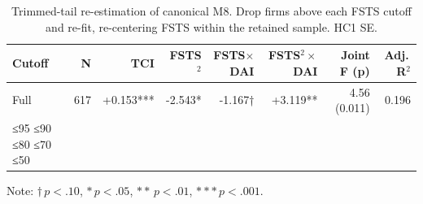 \begin{table}[ht]
\centering
\caption{Trimmed-tail re-estimation of canonical M8. Drop firms above each FSTS cutoff and re-fit, re-centering FSTS within the retained sample. HC1 SE.}
\label{tab:trimmed_tail}
\begin{tabular}{lrrrrrrr}
\toprule
Cutoff & N & TCI & FSTS$^2$ & FSTS$\times$DAI & FSTS$^2\times$DAI & Joint F (p) & Adj.\,R$^2$ \\
\midrule
Full & 617 & +0.153*** & -2.543* & -1.167† & +3.119** & 4.56 (0.011) & 0.196 \\
≤95%
≤90%
≤80%
≤70%
≤50%
\bottomrule
\end{tabular}
\par\smallskip
\footnotesize Note: $\dagger\,p<.10$, $*\,p<.05$, $**\,p<.01$, $***\,p<.001$.
\end{table}